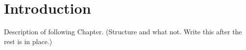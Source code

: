 \documentclass[main.tex]{subfiles}
\begin{document}
\section*{Introduction}

Description of following Chapter. (Structure and what not. Write this after the rest is in place.)
\end{document}
